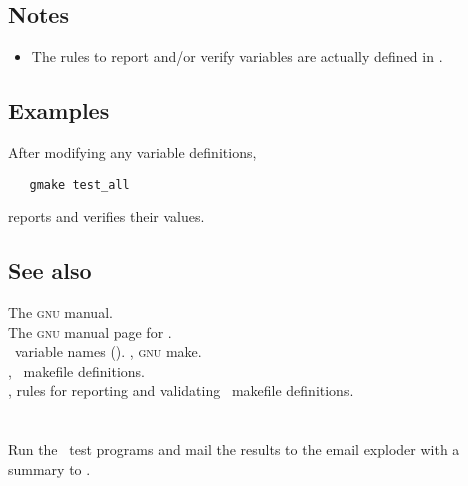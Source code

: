 \subsection*{Notes}

\begin{itemize}
\item
   The rules to report and/or verify  variables are actually
   defined in .
\end{itemize}

\subsection*{Examples}

After modifying any  variable definitions, 

\begin{verbatim}
   gmake test_all
\end{verbatim}

\noindent
reports and verifies their values.

\subsection*{See also}

The \textsc{gnu}  manual.\\
The \textsc{gnu} manual page for .\\
\aipspp\ variable names ().
, \textsc{gnu} make.\\
, \aipspp\ makefile definitions.\\
, rules for reporting and validating \aipspp\ makefile
   definitions.

 
\newpage
\section{}
\label{runtests}


 
Run the \aipspp\ test programs and mail the results to the 
email exploder with a summary to .
 
